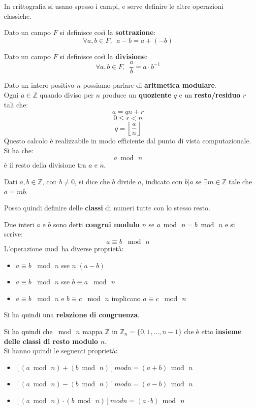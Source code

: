 \documentclass[a4paper,12pt, oneside]{book}
\begin{document}
In crittografia si usano spesso i campi, e serve definire le altre operazioni
classiche.
\begin{definizione}
  Dato un campo $F$ si definisce così la \textbf{sottrazione}:
  \[\forall a,b\in F,\,\,\, a-b=a+(-b)\]
\end{definizione}
\begin{definizione}
  Dato un campo $F$ si definisce così la \textbf{divisione}:
  \[\forall a,b\in F,\,\,\, \frac{a}{b}=a\cdot b^{-1}\]
\end{definizione}
\begin{definizione}
  Dato un intero positivo $n$ possiamo parlare di \textbf{aritmetica
    modulare}. \\
  Ogni $a\in\mathbb{Z}$ quando diviso per $n$ produce un \textbf{quoziente}
  $q$ e un \textbf{resto/residuo} $r$ tali che:
  \[a = qn + r\]
  \[0\leq r<n\]
  \[q=\left\lfloor\frac{a}{n}\right\rfloor\]
  Questo calcolo è realizzabile in modo efficiente dal punto di vista
  computazionale.\\
  Si ha che:
  \[a\bmod \,n\]
  è il resto della divisione tra $a$ e $n$.
\end{definizione}
\begin{definizione}
  Dati $a,b\in\mathbb{Z}$, con $b\neq 0$, si dice che $b$ divide $a$, indicato
  con  $b|a$ se $\exists m\in \mathbb{Z}$ tale che $a=mb$.
\end{definizione}
Posso quindi definire delle \textbf{classi} di numeri tutte con lo stesso
resto.
\begin{definizione}
  Due interi $a$ e $b$ sono detti \textbf{congrui modulo $n$} se $a\bmod\,
  n=b\bmod\, n$ e si scrive:
  \[a\equiv b\,\,\bmod\,n\]
  L'operazione $\bmod$ ha diverse proprietà:
  \begin{itemize}
    \item $a\equiv b\,\,\bmod\,n$ sse $n|(a-b)$
    \item $a\equiv b\,\,\bmod\,n$ sse $b\equiv a\,\,\bmod\,n$
    \item $a\equiv b\,\,\bmod\,n$ e $b\equiv c\,\,\bmod\,n$ implicano $a\equiv
    c\,\,\bmod\,n$ 
  \end{itemize}
  Si ha quindi una \textbf{relazione di congruenza}.
\end{definizione}
Si ha quindi che $\bmod \,n$ mappa $\mathbb{Z}$ in
$\mathbb{Z}_n=\{0,1,\ldots,n-1\}$ che è etto \textbf{insieme delle classi di
  resto modulo $n$}.\\
Si hanno quindi le seguenti proprietà:
\begin{itemize}
  \item $[(a \bmod\,n)+ (b\bmod\,n)]modn = (a + b)\bmod\, n$
  \item $[(a \bmod\,n)- (b\bmod\,n)]modn = (a - b)\bmod\, n$
  \item $[(a \bmod\,n)\cdot (b\bmod\,n)]modn = (a \cdot b)\bmod\, n$
\end{itemize}
\end{document}
